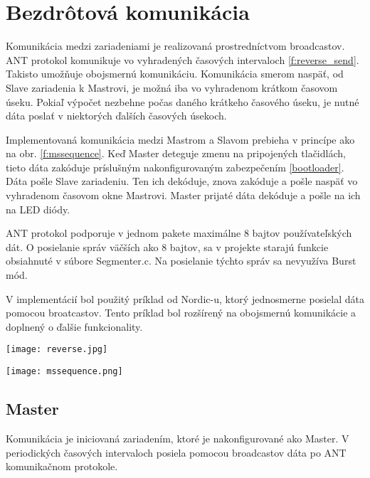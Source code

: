 \documentclass[12pt,a4paper,oneside,openright]{report}
\begin{document}
\section{Bezdrôtová komunikácia}
Komunikácia medzi zariadeniami je realizovaná prostredníctvom broadcastov. 
ANT protokol komunikuje vo vyhradených časových intervaloch \ref{f:reverse_send}. Takisto umožňuje obojsmernú komunikáciu. Komunikácia smerom naspäť, od Slave zariadenia k Mastrovi, je možná iba vo vyhradenom krátkom časovom úseku. Pokiaľ výpočet nezbehne počas daného krátkeho časového úseku, je nutné dáta poslať v niektorých ďalších časových úsekoch.

Implementovaná komunikácia medzi Mastrom a Slavom prebieha v princípe ako na obr. \ref{f:mssequence}. Keď Master deteguje zmenu na pripojených tlačidlách, tieto dáta zakóduje príslušným nakonfigurovaným zabezpečením \ref{bootloader}. Dáta pošle Slave zariadeniu. Ten ich dekóduje, znova zakóduje a pošle naspäť vo vyhradenom časovom okne Mastrovi. Master prijaté dáta dekóduje a pošle na ich na LED diódy.

ANT protokol podporuje v jednom pakete maximálne 8 bajtov používateľských dát. O posielanie správ väčších ako 8 bajtov, sa v projekte starajú funkcie obsiahnuté v súbore Segmenter.c. Na posielanie týchto správ sa nevyužíva Burst mód.

V implementácií bol použitý príklad od Nordic-u, ktorý jednosmerne posielal dáta pomocou broatcastov. Tento príklad bol rozšírený na obojsmernú komunikácie a doplnený o ďalšie funkcionality.

	\begin{figure*}[h]
		\centering
		\texttt{[image: reverse.jpg]}
		\caption{Obojsmerná komunikácia po ANT protokole \cite{ANT}.}
		\label{f:reverse_send}
	\end{figure*}


	\begin{figure*}[h]
		\centering
		\texttt{[image: mssequence.png]}
		\caption{Komunikácia medzi Master a Slave zariadením.}
		\label{f:mssequence}
	\end{figure*}

\subsection{Master}
	Komunikácia je iniciovaná zariadením, ktoré je nakonfigurované ako Master.
	V periodických časových intervaloch posiela pomocou broadcastov dáta po ANT komunikačnom protokole.
	
\end{document}
